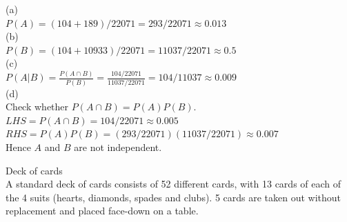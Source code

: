 \documentclass[bigtut]{tutorial}\usepackage[]{graphicx}\usepackage[]{color}
\begin{document}
\begin{tutorial}
\begin{questions}



\begin{solution}
(a) \\ 
$P(A) = (104+189)/22071 = 293/22071 \approx 0.013 $ \\

\vspace{.5cm}
(b) \\
$P(B) = (104+10933)/22071 = 11037/22071 \approx 0.5$ \\

\vspace{.5cm}
(c) \\
$P(A | B) = \frac{ P(A \cap B )}{P(B)} = \frac{104/22071}{11037/22071} = 104/11037 \approx 0.009$ \\

\vspace{.5cm}
(d) \\
Check whether $P(A \cap B) = P(A)P(B)$. \\
$LHS = P(A \cap B)  = 104/22071 \approx 0.005$ \\
$RHS = P(A)P(B) = (293/22071)(11037/22071) \approx 0.007$ \\
Hence $A$ and $B$ are not independent.

\end{solution}


\question  Deck of cards  \\

A standard deck of cards consists of 52 different cards, with 13 cards of each of the 4 suits (hearts, diamonds, spades and clubs). 5 cards are taken out without replacement and placed face-down on a table. \\
\end{questions}
\end{tutorial}
\end{document}
